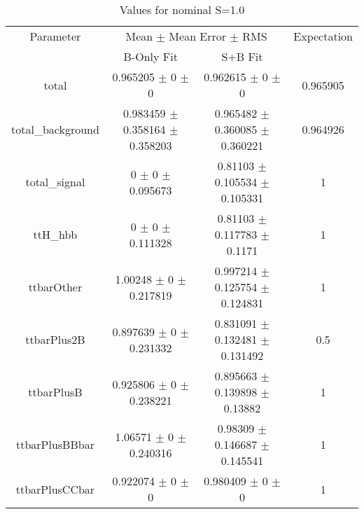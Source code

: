 \begin{table}
\centering
\caption{Values for nominal S=1.0}
\begin{tabular}{cccc}
\toprule
Parameter & \multicolumn{2}{c}{Mean $\pm$ Mean Error $\pm$ RMS} & Expectation\\
 & B-Only Fit & S+B Fit & \\
\midrule
total & \num{0.965205} $\pm$ \num{0} $\pm$ \num{0} & \num{0.962615} $\pm$ \num{0} $\pm$ \num{0} & \num{0.965905}\\
total\_background & \num{0.983459} $\pm$ \num{0.358164} $\pm$ \num{0.358203} & \num{0.965482} $\pm$ \num{0.360085} $\pm$ \num{0.360221} & \num{0.964926}\\
total\_signal & \num{0} $\pm$ \num{0} $\pm$ \num{0.095673} & \num{0.81103} $\pm$ \num{0.105534} $\pm$ \num{0.105331} & \num{1}\\
ttH\_hbb & \num{0} $\pm$ \num{0} $\pm$ \num{0.111328} & \num{0.81103} $\pm$ \num{0.117783} $\pm$ \num{0.1171} & \num{1}\\
ttbarOther & \num{1.00248} $\pm$ \num{0} $\pm$ \num{0.217819} & \num{0.997214} $\pm$ \num{0.125754} $\pm$ \num{0.124831} & \num{1}\\
ttbarPlus2B & \num{0.897639} $\pm$ \num{0} $\pm$ \num{0.231332} & \num{0.831091} $\pm$ \num{0.132481} $\pm$ \num{0.131492} & \num{0.5}\\
ttbarPlusB & \num{0.925806} $\pm$ \num{0} $\pm$ \num{0.238221} & \num{0.895663} $\pm$ \num{0.139898} $\pm$ \num{0.13882} & \num{1}\\
ttbarPlusBBbar & \num{1.06571} $\pm$ \num{0} $\pm$ \num{0.240316} & \num{0.98309} $\pm$ \num{0.146687} $\pm$ \num{0.145541} & \num{1}\\
ttbarPlusCCbar & \num{0.922074} $\pm$ \num{0} $\pm$ \num{0} & \num{0.980409} $\pm$ \num{0} $\pm$ \num{0} & \num{1}\\
\bottomrule
\end{tabular}
\end{table}